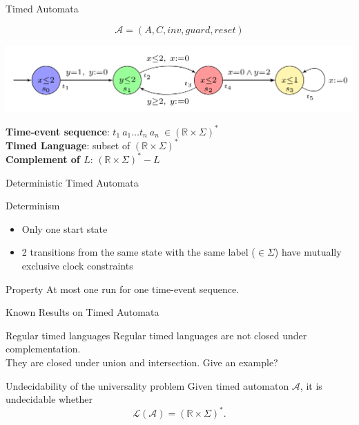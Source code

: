 \begin{frame}{Timed Automata}

  $$\mathcal{A}=(A,C,\mathit{inv},\mathit{guard},\mathit{reset})$$
  \vfill
  \begin{center}
    \includegraphics[scale=0.3]{timed.png}
  \end{center}
  \vfill
  \textbf{Time-event sequence}: $t_1~a_1\dots t_n~a_n~\in (\mathbb{R}\times\Sigma)^*$\\
  \textbf{Timed Language}: subset of $(\mathbb{R}\times\Sigma)^*$\\
  \textbf{Complement of $L$}: $(\mathbb{R}\times\Sigma)^* - L$
  
\end{frame}


\begin{frame}{Deterministic Timed Automata}

  \begin{block}{Determinism}
    \begin{itemize}
    \item Only one start state
    \item 2 transitions from the same state with the same label ($\in\Sigma$) have mutually exclusive clock constraints
    \end{itemize}
  \end{block}
  \vfill
  \begin{block}{Property}
    At most one run for one time-event sequence.
  \end{block}

\end{frame}


\begin{frame}{Known Results on Timed Automata}

  \begin{alertblock}{Regular timed languages}
    Regular timed languages are not closed under complementation.\\
    They are closed under union and intersection.
    {\color{red} Give an example?}
  \end{alertblock}
  \vfill
  \begin{alertblock}{Undecidability of the universality problem}
    Given timed automaton $\mathcal{A}$, it is undecidable whether $$\mathcal{L(A)}=(\mathbb{R}\times\Sigma)^*.$$
  \end{alertblock}
\end{frame}

